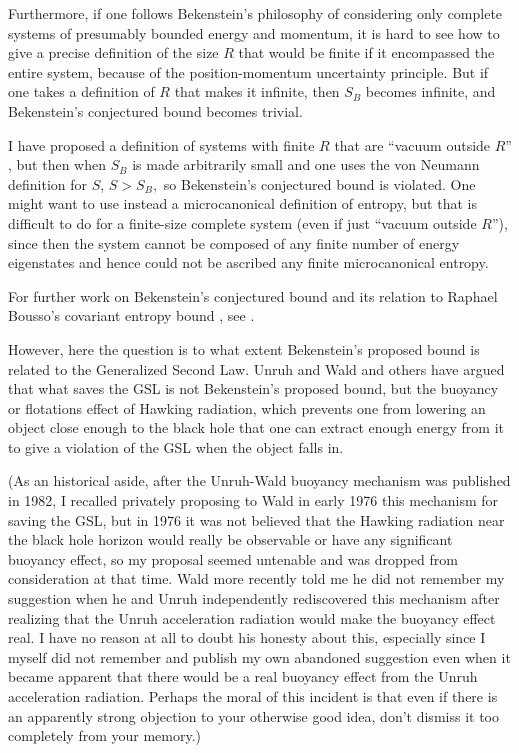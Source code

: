 \documentclass[12pt]{article} \usepackage{latexsym}
\begin{document}
Furthermore, if one follows Bekenstein's philosophy of considering
only complete systems of presumably bounded energy and momentum, it is
hard to see how to give a precise definition of the size $R$ that
would be finite if it encompassed the entire system, because of the
position-momentum uncertainty principle.  But if one takes a
definition of $R$ that makes it infinite, then $S_B$ becomes infinite,
and Bekenstein's conjectured bound becomes trivial.

I have proposed a definition of systems with finite $R$ that are
``vacuum outside $R$'' \cite{Page00c}, but then when $S_B$ is made
arbitrarily small and one uses the von Neumann definition for $S$, $S
> S_B,$ so Bekenstein's conjectured bound is violated.  One might want
to use instead a microcanonical definition of entropy, but that is
difficult to do for a finite-size complete system (even if just
``vacuum outside $R$''), since then the system cannot be composed of
any finite number of energy eigenstates and hence could not be
ascribed any finite microcanonical entropy.

For further work on Bekenstein's conjectured bound and its relation to
Raphael Bousso's covariant entropy bound
\cite{Bousso99,Bousso00,FMW,Bousso02,BFM}, see
\cite{Bousso01,Bousso03,Bousso04a,Bousso04b,Bousso04c}.

However, here the question is to what extent Bekenstein's proposed
bound is related to the Generalized Second Law.  Unruh and Wald and
others \cite{UW,UW2,Zas,PW} have argued that what saves the GSL is not
Bekenstein's proposed bound, but the buoyancy or flotations effect of
Hawking radiation, which prevents one from lowering an object close
enough to the black hole that one can extract enough energy from it to
give a violation of the GSL when the object falls in.

(As an historical aside, after the Unruh-Wald buoyancy mechanism was
published in 1982, I recalled privately proposing to Wald in early 1976
this mechanism for saving the GSL, but in 1976 it was not believed that
the Hawking radiation near the black hole horizon would really be
observable or have any significant buoyancy effect, so my proposal
seemed untenable and was dropped from consideration at that time. Wald
more recently told me he did not remember my suggestion when he and
Unruh independently rediscovered this mechanism after realizing that
the Unruh acceleration radiation \cite{Unracc} would make the buoyancy
effect real.  I have no reason at all to doubt his honesty about this,
especially since I myself did not remember and publish my own abandoned
suggestion even when it became apparent that there would be a real
buoyancy effect from the Unruh acceleration radiation. Perhaps the
moral of this incident is that even if there is an apparently strong
objection to your otherwise good idea, don't dismiss it too completely
from your memory.)
\end{document}
